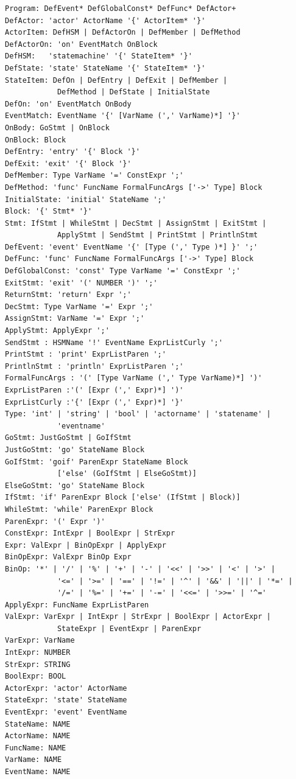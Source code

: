 \begin{verbatim}
Program: DefEvent* DefGlobalConst* DefFunc* DefActor+
DefActor: 'actor' ActorName '{' ActorItem* '}'
ActorItem: DefHSM | DefActorOn | DefMember | DefMethod
DefActorOn: 'on' EventMatch OnBlock
DefHSM:   'statemachine' '{' StateItem* '}'
DefState: 'state' StateName '{' StateItem* '}'
StateItem: DefOn | DefEntry | DefExit | DefMember | 
            DefMethod | DefState | InitialState
DefOn: 'on' EventMatch OnBody
EventMatch: EventName '{' [VarName (',' VarName)*] '}'
OnBody: GoStmt | OnBlock
OnBlock: Block
DefEntry: 'entry' '{' Block '}'
DefExit: 'exit' '{' Block '}'
DefMember: Type VarName '=' ConstExpr ';'
DefMethod: 'func' FuncName FormalFuncArgs ['->' Type] Block
InitialState: 'initial' StateName ';'
Block: '{' Stmt* '}'
Stmt: IfStmt | WhileStmt | DecStmt | AssignStmt | ExitStmt | 
            ApplyStmt | SendStmt | PrintStmt | PrintlnStmt
DefEvent: 'event' EventName '{' [Type (',' Type )*] }' ';'
DefFunc: 'func' FuncName FormalFuncArgs ['->' Type] Block
DefGlobalConst: 'const' Type VarName '=' ConstExpr ';'
ExitStmt: 'exit' '(' NUMBER ')' ';'
ReturnStmt: 'return' Expr ';'
DecStmt: Type VarName '=' Expr ';'
AssignStmt: VarName '=' Expr ';'
ApplyStmt: ApplyExpr ';'
SendStmt : HSMName '!' EventName ExprListCurly ';'
PrintStmt : 'print' ExprListParen ';'
PrintlnStmt : 'println' ExprListParen ';'
FormalFuncArgs : '(' [Type VarName (',' Type VarName)*] ')'
ExprListParen :'(' [Expr (',' Expr)*] ')'
ExprListCurly :'{' [Expr (',' Expr)*] '}'
Type: 'int' | 'string' | 'bool' | 'actorname' | 'statename' | 
            'eventname'
GoStmt: JustGoStmt | GoIfStmt
JustGoStmt: 'go' StateName Block
GoIfStmt: 'goif' ParenExpr StateName Block 
            ['else' (GoIfStmt | ElseGoStmt)]
ElseGoStmt: 'go' StateName Block
IfStmt: 'if' ParenExpr Block ['else' (IfStmt | Block)] 
WhileStmt: 'while' ParenExpr Block 
ParenExpr: '(' Expr ')' 
ConstExpr: IntExpr | BoolExpr | StrExpr
Expr: ValExpr | BinOpExpr | ApplyExpr
BinOpExpr: ValExpr BinOp Expr 
BinOp: '*' | '/' | '%' | '+' | '-' | '<<' | '>>' | '<' | '>' |
            '<=' | '>=' | '==' | '!=' | '^' | '&&' | '||' | '*=' | 
            '/=' | '%=' | '+=' | '-=' | '<<=' | '>>=' | '^='
ApplyExpr: FuncName ExprListParen
ValExpr: VarExpr | IntExpr | StrExpr | BoolExpr | ActorExpr | 
            StateExpr | EventExpr | ParenExpr
VarExpr: VarName
IntExpr: NUMBER 
StrExpr: STRING 
BoolExpr: BOOL
ActorExpr: 'actor' ActorName
StateExpr: 'state' StateName
EventExpr: 'event' EventName
StateName: NAME
ActorName: NAME
FuncName: NAME
VarName: NAME
EventName: NAME
\end{verbatim}

